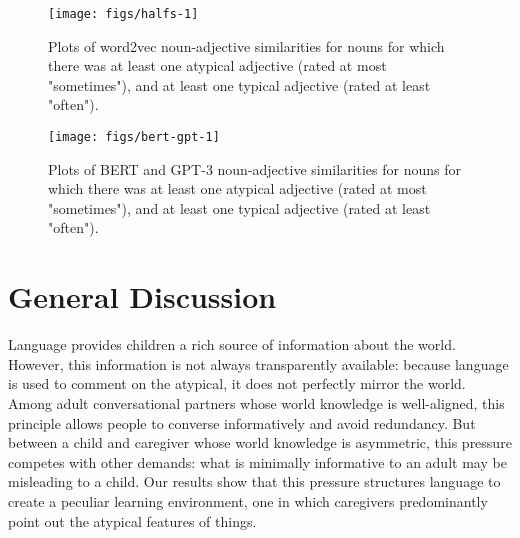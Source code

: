 \documentclass{ucetd}
\begin{document}
\begin{figure}[!tb]

{\centering \texttt{[image: figs/halfs-1]} 

}

\caption{Plots of word2vec noun-adjective similarities for nouns for which there was at least one atypical adjective (rated at most "sometimes"), and at least one typical adjective (rated at least "often").}\label{fig:halfs}
\end{figure}

\begin{figure}[!tb]

{\centering \texttt{[image: figs/bert-gpt-1]} 

}

\caption{Plots of BERT and GPT-3 noun-adjective similarities for nouns for which there was at least one atypical adjective (rated at most "sometimes"), and at least one typical adjective (rated at least "often").}\label{fig:bert-gpt}
\end{figure}

\hypertarget{general-discussion}{%
\section{General Discussion}\label{general-discussion}}

Language provides children a rich source of information about the world.
However, this information is not always transparently available: because
language is used to comment on the atypical, it does not perfectly
mirror the world. Among adult conversational partners whose world
knowledge is well-aligned, this principle allows people to converse
informatively and avoid redundancy. But between a child and caregiver
whose world knowledge is asymmetric, this pressure competes with other
demands: what is minimally informative to an adult may be misleading to
a child. Our results show that this pressure structures language to
create a peculiar learning environment, one in which caregivers
predominantly point out the atypical features of things.
\end{document}
